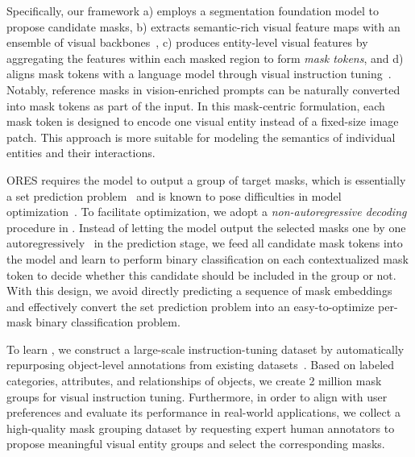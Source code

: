 Specifically, our \ourmodel framework
a) employs a segmentation foundation model to propose candidate masks,
b) extracts semantic-rich visual feature maps with an ensemble of visual backbones~\cite{tong2024cambrian},
c) produces entity-level visual features by aggregating the features within each masked region to form \emph{mask tokens}, and
d) aligns mask tokens with a language model through visual instruction tuning~\cite{liu2023visual}. Notably, reference masks in vision-enriched prompts can be naturally converted into mask tokens as part of the input.
In this mask-centric formulation, each mask token is designed to encode one visual entity instead of a fixed-size image patch. This approach is more suitable for modeling the semantics of individual entities and their interactions.

ORES requires the model to output a group of target masks, which is essentially a set prediction problem~\cite{rezatofighi2017deepsetnet} and is known to pose difficulties in model optimization~\cite{sun2021rethinking}. To facilitate optimization, we adopt a \emph{non-autoregressive decoding}~\cite{carion2020end, vinyals2015pointer} procedure in \ourmodel. Instead of letting the model output the selected masks one by one autoregressively~\cite{lai2024lisa, xia2024gsva, zhang2024groundhog} in the prediction stage, we feed all candidate mask tokens into the model and learn to perform binary classification on each contextualized mask token to decide whether this candidate should be included in the group or not. With this design, we avoid directly predicting a sequence of mask embeddings~\cite{lai2024lisa, zhang2024groundhog} and effectively convert the set prediction problem into an easy-to-optimize per-mask binary classification problem.

To learn \ourmodel, we construct a large-scale instruction-tuning dataset \ourlargedata by automatically repurposing object-level annotations from existing datasets~\cite{lin2014microsoft, gupta2019lvis, krishna2017visual, yu2016modeling, liu2023gres}. Based on labeled categories, attributes, and relationships of objects, we create 2 million mask groups for visual instruction tuning.
Furthermore, in order to align \ourmodel with user preferences and evaluate its performance in real-world applications, we collect a high-quality mask grouping dataset \ourgooddata by requesting expert human annotators to propose meaningful visual entity groups and select the corresponding masks.

